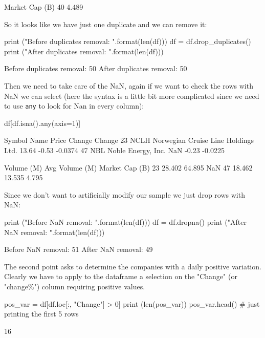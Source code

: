 \begin{solution}
\begin{ipython}
    Market Cap (B)
40           4.489
\end{ipython}
        
So it looks like we have just one duplicate and we can remove it:

\begin{ipython}
print ("Before duplicates removal: {}".format(len(df)))
df = df.drop_duplicates()
print ("After duplicates removal: {}".format(len(df)))
\end{ipython}
\begin{ioutput}
Before duplicates removal: 50
After duplicates removal: 50
\end{ioutput}

Then we need to take care of the NaN, again if we want to check the rows with NaN we can select (here the syntax is a little bit more complicated since we need to use \texttt{any} to look for Nan in every column):

\begin{ipython}
df[df.isna().any(axis=1)]
\end{ipython}
\begin{ioutput}
   Symbol                                 Name  Price  Change  Change%
23   NCLH  Norwegian Cruise Line Holdings Ltd.  13.64   -0.53  -0.0374
47    NBL                   Noble Energy, Inc.    NaN   -0.23  -0.0225

    Volume (M)  Avg Volume (M)  Market Cap (B)
23      28.402          64.895             NaN
47      18.462          13.535           4.795
\end{ioutput}
        
Since we don't want to artificially modify our sample we just drop rows with NaN:

\begin{ipython}
print ("Before NaN removal: {}".format(len(df)))
df = df.dropna()
print ("After NaN removal: {}".format(len(df)))
\end{ipython}
\begin{ioutput}
Before NaN removal: 51
After NaN removal: 49
\end{ioutput}

The second point asks to determine the companies with a daily positive variation. Clearly we have to apply to the dataframe a selection on the "Change" (or "change\%") column requiring positive values.

\begin{ipython}
pos_var = df[df.loc[:, "Change"] > 0]
print (len(pos_var))
pos_var.head() # just printing the first 5 rows
\end{ipython}
\begin{ioutput}
16


\end{ioutput}
\end{solution}
